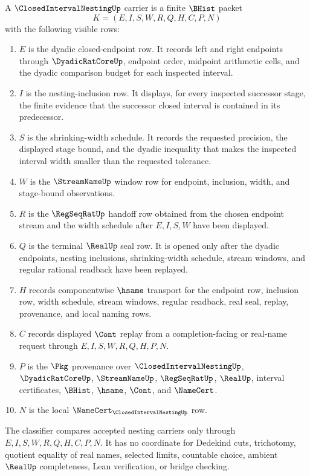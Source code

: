 \begin{definition}
\label{def:closed-interval-nesting-carrier}
A $\ClosedIntervalNestingUp$ carrier is a finite $\BHist$ packet
$$
K=(E,I,S,W,R,Q,H,C,P,N)
$$
with the following visible rows:
\begin{enumerate}
\item $E$ is the dyadic closed-endpoint row. It records left and right endpoints through $\DyadicRatCoreUp$, endpoint order, midpoint arithmetic cells, and the dyadic comparison budget for each inspected interval.
\item $I$ is the nesting-inclusion row. It displays, for every inspected successor stage, the finite evidence that the successor closed interval is contained in its predecessor.
\item $S$ is the shrinking-width schedule. It records the requested precision, the displayed stage bound, and the dyadic inequality that makes the inspected interval width smaller than the requested tolerance.
\item $W$ is the $\StreamNameUp$ window row for endpoint, inclusion, width, and stage-bound observations.
\item $R$ is the $\RegSeqRatUp$ handoff row obtained from the chosen endpoint stream and the width schedule after $E,I,S,W$ have been displayed.
\item $Q$ is the terminal $\RealUp$ seal row. It is opened only after the dyadic endpoints, nesting inclusions, shrinking-width schedule, stream windows, and regular rational readback have been replayed.
\item $H$ records componentwise $\hsame$ transport for the endpoint row, inclusion row, width schedule, stream windows, regular readback, real seal, replay, provenance, and local naming rows.
\item $C$ records displayed $\Cont$ replay from a completion-facing or real-name request through $E,I,S,W,R,Q,H,P,N$.
\item $P$ is the $\Pkg$ provenance over $\ClosedIntervalNestingUp$, $\DyadicRatCoreUp$, $\StreamNameUp$, $\RegSeqRatUp$, $\RealUp$, interval certificates, $\BHist$, $\hsame$, $\Cont$, and $\NameCert$.
\item $N$ is the local $\NameCert_{\ClosedIntervalNestingUp}$ row.
\end{enumerate}
The classifier compares accepted nesting carriers only through $E,I,S,W,R,Q,H,C,P,N$. It has no coordinate for Dedekind cuts, trichotomy, quotient equality of real names, selected limits, countable choice, ambient $\RealUp$ completeness, Lean verification, or bridge checking.
\end{definition}


